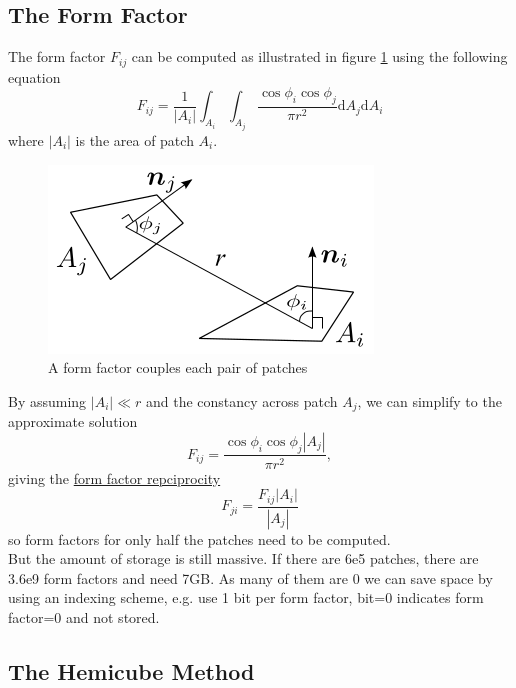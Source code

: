 \documentclass[twocolumn,landscape,10pt]{article}
\theoremstyle{definition}
\begin{document}
\subsection{The Form Factor}

The form factor $F_{ij}$ can be computed as illustrated in figure
\ref{fig:form_factor} using the following equation
\[
    F_{ij}=\frac{1}{|A_{i}|}\int_{A_i}\int_{A_j}
    \frac{\cos{\phi_i}\cos{\phi_j}}{\pi r^2}
    \mathrm{d}A_j\mathrm{d}A_i
\]
where $|A_i|$ is the area of patch $A_i$.
\begin{figure}[h]
    \includegraphics[scale=0.4]{form_factor.png}
    \centering
    \caption{A form factor couples each pair of
    patches}\label{fig:form_factor}
\end{figure}
By assuming $|A_i|\ll r$ and the constancy across patch $A_j$,
we can simplify to the approximate solution
\[
    F_{ij}=\frac{\cos{\phi_i}\cos{\phi_j}|A_j|}{\pi r^2},
\]
giving the \underline{form factor repciprocity}
\[
    F_{ji}=\frac{F_{ij}|A_i|}{|A_j|}
\]
so form factors for only half the patches need to be computed. 
\smallskip
\\But the amount of storage is still massive.
If there are 6e5 patches, there are 3.6e9 form factors and need 7GB.
As many of them are 0 we can save space by using an indexing scheme,
e.g. use 1 bit per form factor, bit=0 indicates form factor=0 and not stored.

\subsection{The Hemicube Method}
\end{document}
